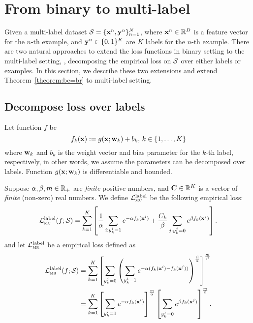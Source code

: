 \section{From binary to multi-label}
\label{sec:ml}

Given a multi-label dataset $\mathcal{S} = \{\mathbf{x}^n, \mathbf{y}^n\}_{n=1}^N$, where $\mathbf{x}^n \in \mathbb{R}^D$ is a feature vector for the $n$-th example,
and $\mathbf{y}^n \in \{0,1\}^K$ are $K$ labels for the $n$-th example.
There are two natural approaches to extend the loss functions in binary setting to the multi-label setting, 
\ie, decomposing the empirical loss on $\mathcal{S}$ over either labels or examples.
In this section, we describe these two extensions and extend Theorem~\ref{theorem:bc=br} to multi-label setting.


\subsection{Decompose loss over labels}

Let function $f$ be
\begin{equation*}
f_k(\mathbf{x}) := g(\mathbf{x}; \mathbf{w}_k) + b_k, \, k \in \{1,\dots,K\}
\end{equation*}
where $\mathbf{w}_k$ and $b_k$ is the weight vector and bias parameter for the $k$-th label, respectively,
in other words, we assume the parameters can be decomposed over labels.
Function $g(\mathbf{x}; \mathbf{w}_k)$ is differentiable and bounded.

Suppose $\alpha, \beta, m \in \mathbb{R}_+$ are \emph{finite} positive numbers, 
and $\mathbf{C} \in \mathbb{R}^K$ is a vector of \emph{finite} (non-zero) real numbers.
We define $\mathcal{L}_\textsc{mc}^\text{label}$ be the following empirical loss:
\begin{equation}
\label{eq:mc1}
\displaystyle
\mathcal{L}_\textsc{mc}^\text{label}(f; \mathcal{S})
= \sum_{k=1}^K \left[ 
  \frac{1}{\alpha} \sum_{i: y_k^i = 1} e^{-\alpha f_k(\mathbf{x}^i)} +
  \frac{C_k}{\beta} \sum_{j: y_k^j = 0} e^{\beta  f_k(\mathbf{x}^j)} \right].
\end{equation}
and let $\mathcal{L}_\textsc{mr}^\text{label}$ be a empirical loss defined as
\begin{equation}
\label{eq:mr1}
\begin{aligned}
\displaystyle
\mathcal{L}_\textsc{mr}^\text{label}(f; \mathcal{S})
&= \sum_{k=1}^K
   \left[ \sum_{y_k^j = 0} \left( \sum_{y_k^i = 1} e^{-\alpha(f_k(\mathbf{x}^i) - f_k(\mathbf{x}^j))} \right)^\frac{\beta}{\alpha} \right]^\frac{m}{\beta} \\
&= \sum_{k=1}^K
   \left[ \sum_{y_k^i = 1} e^{-\alpha f_k(\mathbf{x}^i)} \right]^\frac{m}{\alpha} 
   \left[ \sum_{y_k^j = 0} e^{ \beta  f_k(\mathbf{x}^j)} \right]^\frac{m}{\beta}.
\end{aligned}
\end{equation}


